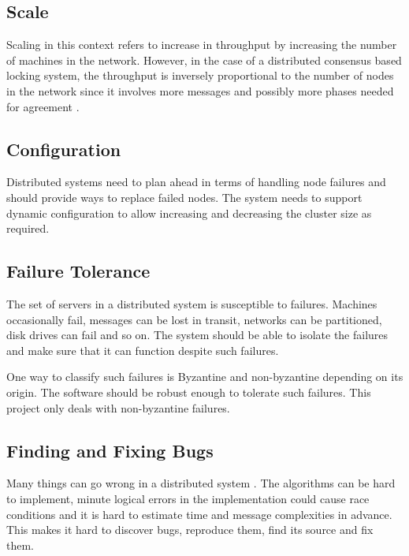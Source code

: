 \subsection{Scale}

Scaling in this context refers to increase in throughput by increasing the
number of machines in the network. However, in the case of a distributed 
consensus based locking system, the throughput is inversely proportional to the
number of nodes in the network since it involves more messages and possibly
more phases needed for agreement%
.

\subsection{Configuration}

Distributed systems need to plan ahead in terms of handling node failures and
should provide ways to replace failed nodes. The system needs to support dynamic
configuration to allow increasing and decreasing the cluster size as required.

\subsection{Failure Tolerance}

The set of servers in a distributed system is susceptible to failures.
Machines occasionally fail, messages can be lost in transit, networks can be
partitioned, disk drives can fail and so on. The system should be able to
isolate the failures and make sure that it can function despite such failures.

One way to classify such failures is Byzantine%
and non-byzantine%
depending on its origin. The software should be robust enough to tolerate such
failures. This project only deals with non-byzantine failures.

\subsection{Finding and Fixing Bugs}

Many things can go wrong in a distributed system 
\citep{Rotem-gal-oz_fallaciesof}. The algorithms can be hard to implement, 
minute logical errors in the implementation could cause race conditions and
it is hard to estimate time and message complexities in advance. This makes it
hard to discover bugs, reproduce them, find its source and fix them.


